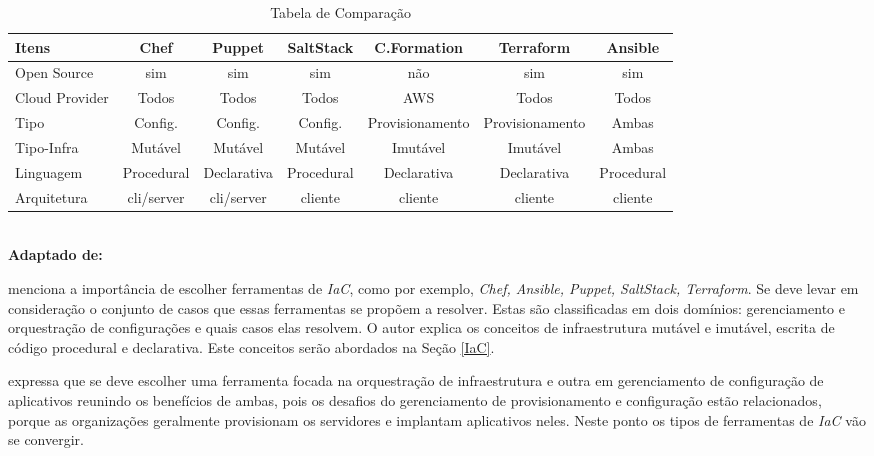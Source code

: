 \begin{table}[H]
	\centering
	\caption{\hspace{0.1cm} Tabela de Comparação}
	\vspace{-0.3cm} %
	\label{tab:tabela2}
	\begin{adjustbox}{max width=\textwidth}
	\begin{tabular}{l|c|c|c|c|c|c}
  \hline
    \textbf{Itens} & \textbf{Chef} & \textbf{Puppet} & \textbf{SaltStack} & \textbf{C.Formation} & \textbf{Terraform} & \textbf{Ansible} \\
    \hline
            Open Source  & sim & sim & sim & não & sim & sim \\
            Cloud Provider & Todos & Todos & Todos & AWS & Todos & Todos  \\
            Tipo  & Config. & Config. & Config. & Provisionamento & Provisionamento & Ambas \\
            Tipo-Infra  & Mutável & Mutável & Mutável & Imutável & Imutável & Ambas  \\    
            Linguagem  & Procedural & Declarativa & Procedural & Declarativa & Declarativa & Procedural \\
            Arquitetura &  cli/server & cli/server & cliente & cliente & cliente & cliente  \\ 


     \hline
 \end{tabular}
 \end{adjustbox}
 	\vspace{.01cm}  %
	\small
	{\footnotesize\\ \textbf{Adaptado de:  \cite{masek}}}
\end{table}



\hfill

  menciona a importância de escolher ferramentas de \textit{IaC}, como por exemplo,\textit{ Chef, Ansible, Puppet, SaltStack, Terraform}. Se deve levar em consideração o conjunto de casos  que essas ferramentas se propõem a resolver. Estas são classificadas em dois domínios: gerenciamento e orquestração de configurações e quais casos elas resolvem. O autor explica os conceitos de infraestrutura mutável e imutável, escrita de código procedural e declarativa. Este conceitos serão abordados na Seção \ref{IaC}. 

 expressa que se deve escolher uma ferramenta focada na orquestração de infraestrutura e outra em gerenciamento de configuração de aplicativos reunindo os benefícios de ambas, pois os desafios do gerenciamento de provisionamento e configuração estão relacionados, porque as organizações geralmente provisionam os servidores e implantam aplicativos neles. Neste ponto os tipos de ferramentas de \textit{IaC} vão se convergir.


